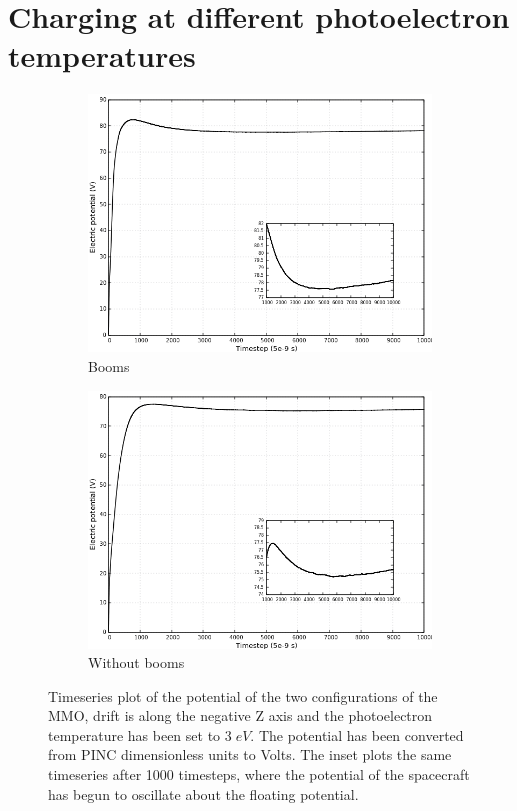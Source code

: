 \section{Charging at different photoelectron temperatures}

\begin{figure}[H]
  \centering
  \begin{subfigure}[b]{0.75\textwidth}
  \includegraphics[width=\columnwidth]{figures/MMO/PHTemp/WB/C_PHTemp_WB.png}
  \caption{Booms}
  \label{fig:C_PHTemp_WB}
\end{subfigure}
\par\bigskip
\begin{subfigure}[b]{0.75\textwidth}
  \includegraphics[width=\columnwidth]{figures/MMO/PHTemp/NB/C_PHTemp_NB.png}
  \caption{Without booms}
  \label{fig:C_PHTemp_NB}
\end{subfigure}
\label{fig:Conv_PHTemp}
\caption{Timeseries plot of the potential of the two configurations of the MMO, drift is along the negative Z axis and the photoelectron temperature has been set to $3 \; eV$. The potential has been converted from PINC dimensionless units to Volts. The inset plots the same timeseries after 1000 timesteps, where the potential of the spacecraft has begun to oscillate about the floating potential.}
\end{figure}

